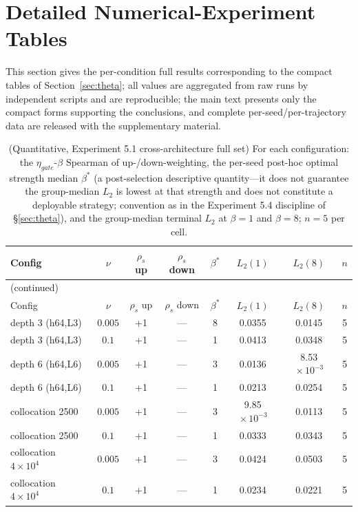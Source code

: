 \documentclass[11pt]{article}
\numberwithin{equation}{section}
\begin{document}
\FloatBarrier
\clearpage


\section{Detailed Numerical-Experiment Tables}\label{app:data}
\footnotesize\setlength{\tabcolsep}{2.6pt}
This section gives the per-condition full results corresponding to the compact tables of Section~\ref{sec:theta}; all values are aggregated from raw runs by independent scripts and are reproducible; the main text presents only the compact forms supporting the conclusions, and complete per-seed/per-trajectory data are released with the supplementary material.

\begin{longtable}{lccccccc}
\caption{(Quantitative, Experiment 5.1 cross-architecture full set) For each configuration: the $\eta_{gate}$-$\beta$ Spearman of up-/down-weighting, the per-seed post-hoc optimal strength median $\beta^*$ (a post-selection descriptive quantity---it does not guarantee the group-median $L_2$ is lowest at that strength and does not constitute a deployable strategy; convention as in the Experiment 5.4 discipline of \S\ref{sec:theta}), and the group-median terminal $L_2$ at $\beta=1$ and $\beta=8$; $n=5$ per cell.}\label{tab:app-r1}\\
\toprule
Config & $\nu$ & $\rho_s$ up & $\rho_s$ down & $\beta^*$ & $L_2(1)$ & $L_2(8)$ & $n$\\\midrule\endfirsthead
\multicolumn{8}{l}{\small (continued)}\\\toprule
Config & $\nu$ & $\rho_s$ up & $\rho_s$ down & $\beta^*$ & $L_2(1)$ & $L_2(8)$ & $n$\\\midrule\endhead
depth 3 (h64,L3) & $0.005$ & +1 & --- & 8 & 0.0355 & 0.0145 & 5 \\
depth 3 (h64,L3) & $0.1$ & +1 & --- & 1 & 0.0413 & 0.0348 & 5 \\
depth 6 (h64,L6) & $0.005$ & +1 & --- & 3 & 0.0136 & 8.53$\!\times\!10^{-3}$ & 5 \\
depth 6 (h64,L6) & $0.1$ & +1 & --- & 1 & 0.0213 & 0.0254 & 5 \\
collocation 2500 & $0.005$ & +1 & --- & 3 & 9.85$\!\times\!10^{-3}$ & 0.0113 & 5 \\
collocation 2500 & $0.1$ & +1 & --- & 1 & 0.0333 & 0.0343 & 5 \\
collocation $4\times10^4$ & $0.005$ & +1 & --- & 3 & 0.0424 & 0.0503 & 5 \\
collocation $4\times10^4$ & $0.1$ & +1 & --- & 1 & 0.0234 & 0.0221 & 5 \\

\end{longtable}
\end{document}
